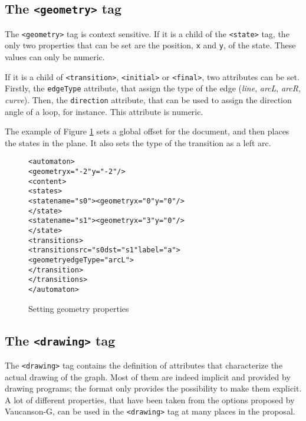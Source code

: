 \documentclass[a4paper]{llncs}
\def\statetag{\texttt{<state>}}
\def\dstname{\texttt{dst}}
\def\srcname{\texttt{src}}
\def\transitiontag{\texttt{<transition>}}
\def\finaltag{\texttt{<final>}}
\def\initialtag{\texttt{<initial>}}
\def\geometrytag{\texttt{<geometry>}}
\def\drawingtag{\texttt{<drawing>}}
\begin{document}
\subsection{The \geometrytag{} tag}

The \geometrytag{} tag is context sensitive. If it is a child of
the \statetag{} tag, the only two properties that can be set are the
position, \verb|x| and \verb|y|, of the state. These values can only be numeric.

If it is a child of \transitiontag{}, \initialtag{} or
\finaltag{}, two attributes can be set. Firstly, the \texttt{edgeType}
attribute, that assign the type of the edge (\textit{line},
\textit{arcL}, \textit{arcR}, \textit{curve}). Then, the
\texttt{direction} attribute, that can be used to assign the direction
angle of a loop, for instance. This attribute is numeric.

The example of Figure \ref{geom1} sets a global offset
for the document, and then places the states in the plane.
It also sets the type of the transition as a left arc.
{\small

\begin{figure}[h]
  \begin{center}
\begin{alltt}
<automaton>
  <geometry x="-2" y="-2"/>
  <content>
     <states>
        <state name="s0"><geometry x="0" y="0"/>
        </state>
        <state name="s1"><geometry x="3" y="0"/>
        </state>
     <transitions>
        <transition \srcname{}="s0 \dstname{}="s1" label="a">
          <geometry edgeType="arcL">
        </transition>
     </transitions>
</automaton>
\end{alltt}

\caption{Setting geometry properties}
\label{geom1}
  \end{center}
\end{figure}

}

\subsection{The \drawingtag{} tag}

The \drawingtag{} tag contains the definition of attributes that characterize
the actual drawing of the graph.
Most of them are indeed implicit and provided by drawing programs; the
format only provides the possibility to make them explicit.
A lot of different properties, that have been taken from the options proposed by
Vaucanson-G, can be used in the \drawingtag{} tag at many places in the proposal.
\end{document}
